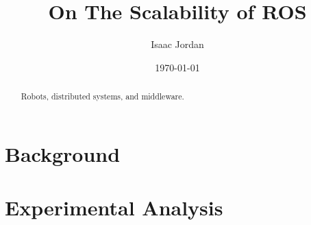 \documentclass{l4proj}
\begin{document}
\title{On The Scalability of ROS}
\author{Isaac Jordan}
\date{\today}
\maketitle

\begin{abstract}
Robots, distributed systems, and middleware.
\end{abstract}

\educationalconsent
%
%
\tableofcontents






\chapter{Background}








\chapter{Experimental Analysis}




\end{document}
